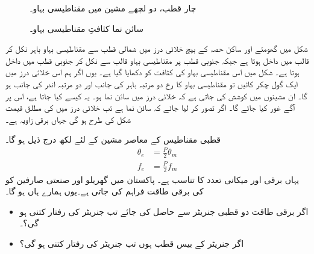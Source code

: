 \begin{figure}
\begin{minipage}{0.45\textwidth}
\caption{چار قطب، دو لچھے مشین میں مقناطیسی بہاو۔}
\label{شکل_گھومتے_مشین_چار_قطب_کا_بہاو}
\end{minipage}%
\begin{minipage}{0.45\textwidth}
\centering
\caption{سائن نما کثافتِ مقناطیسی بہاو۔}
\label{شکل_گھومتے_مشین_سائن_نما_بہاو}
\end{minipage}%
\end{figure}



شکل  میں گھومتے اور ساکن حصہ کے بیچ خلائی درز میں  شمالی قطب سے مقناطیسی بہاو باہر نکل کر  قالب میں داخل ہوتا ہے جبکہ جنوبی قطب پر مقناطیسی بہاو قالب سے نکل کر جنوبی قطب میں  داخل ہوتا ہے۔ شکل   میں اس مقناطیسی بہاو کی کثافت کو دکھایا گیا ہے۔ یوں اگر ہم اس خلائی درز میں ایک گول چکر کاٹیں تو مقناطیسی بہاو کا رخ  دو مرتبہ باہر کی جانب اور دو مرتبہ اندر کی جانب ہو گا۔ ان مشینوں  میں کوشش کی جاتی ہے کہ خلائی درز میں  سائن نما ہو۔ یہ کیسے کیا جاتا ہے، اس پر آگے غور کیا جائے گا۔ اگر تصور کر لیا جائے کہ  سائن نما ہے تب  خلائی درز میں  کی مطلق قیمت شکل   کی طرح ہو گی جہاں  برقی زاویہ ہے۔ 

 قطبی مقناطیس کے معاصر مشین  کے لئے لکھ درج ذیل ہو گا۔
\begin{align}
\theta_e&=\frac{P}{2} \theta_m\\
f_e&=\frac{P}{2} f_m  \label{مساوات_گھومتے_مشین_برقی_میکانی_تعدد_تعلق}
\end{align}
یہاں برقی اور میکانی  تعدد کا تناسب  ہے۔ 
%
پاکستان میں گھریلو اور صنعتی صارفین کو  کی برقی طاقت فراہم کی جاتی ہے۔یوں ہمارے ہاں  ہو گا۔
\begin{itemize}
\item
اگر برقی طاقت دو قطبی جنریٹر سے حاصل کی جائے تب جنریٹر  کی رفتار کتنی ہو گی؟۔
\item
اگر جنریٹر کے بیس قطب ہوں تب  جنریٹر کی رفتار کتنی ہو گی؟
\end{itemize}

